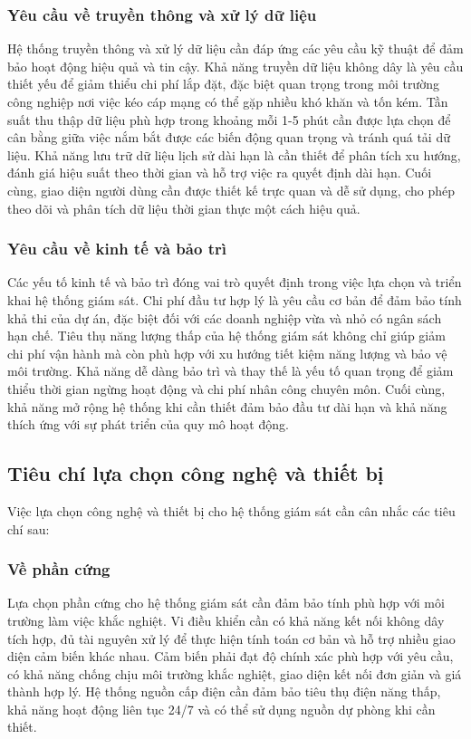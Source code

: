 \documentclass[../main.tex]{subfiles}
\begin{document}
\subsubsection{Yêu cầu về truyền thông và xử lý dữ liệu}
Hệ thống truyền thông và xử lý dữ liệu cần đáp ứng các yêu cầu kỹ thuật để đảm bảo hoạt động hiệu quả và tin cậy. Khả năng truyền dữ liệu không dây là yêu cầu thiết yếu để giảm thiểu chi phí lắp đặt, đặc biệt quan trọng trong môi trường công nghiệp nơi việc kéo cáp mạng có thể gặp nhiều khó khăn và tốn kém. Tần suất thu thập dữ liệu phù hợp trong khoảng mỗi 1-5 phút cần được lựa chọn để cân bằng giữa việc nắm bắt được các biến động quan trọng và tránh quá tải dữ liệu. Khả năng lưu trữ dữ liệu lịch sử dài hạn là cần thiết để phân tích xu hướng, đánh giá hiệu suất theo thời gian và hỗ trợ việc ra quyết định dài hạn. Cuối cùng, giao diện người dùng cần được thiết kế trực quan và dễ sử dụng, cho phép theo dõi và phân tích dữ liệu thời gian thực một cách hiệu quả.

\subsubsection{Yêu cầu về kinh tế và bảo trì}
Các yếu tố kinh tế và bảo trì đóng vai trò quyết định trong việc lựa chọn và triển khai hệ thống giám sát. Chi phí đầu tư hợp lý là yêu cầu cơ bản để đảm bảo tính khả thi của dự án, đặc biệt đối với các doanh nghiệp vừa và nhỏ có ngân sách hạn chế. Tiêu thụ năng lượng thấp của hệ thống giám sát không chỉ giúp giảm chi phí vận hành mà còn phù hợp với xu hướng tiết kiệm năng lượng và bảo vệ môi trường. Khả năng dễ dàng bảo trì và thay thế là yếu tố quan trọng để giảm thiểu thời gian ngừng hoạt động và chi phí nhân công chuyên môn. Cuối cùng, khả năng mở rộng hệ thống khi cần thiết đảm bảo đầu tư dài hạn và khả năng thích ứng với sự phát triển của quy mô hoạt động.

\subsection{Tiêu chí lựa chọn công nghệ và thiết bị}
\label{sec:technology_selection_criteria}

Việc lựa chọn công nghệ và thiết bị cho hệ thống giám sát cần cân nhắc các tiêu chí sau:

\subsubsection{Về phần cứng}
Lựa chọn phần cứng cho hệ thống giám sát cần đảm bảo tính phù hợp với môi trường làm việc khắc nghiệt. Vi điều khiển cần có khả năng kết nối không dây tích hợp, đủ tài nguyên xử lý để thực hiện tính toán cơ bản và hỗ trợ nhiều giao diện cảm biến khác nhau. Cảm biến phải đạt độ chính xác phù hợp với yêu cầu, có khả năng chống chịu môi trường khắc nghiệt, giao diện kết nối đơn giản và giá thành hợp lý. Hệ thống nguồn cấp điện cần đảm bảo tiêu thụ điện năng thấp, khả năng hoạt động liên tục 24/7 và có thể sử dụng nguồn dự phòng khi cần thiết.
\end{document}
